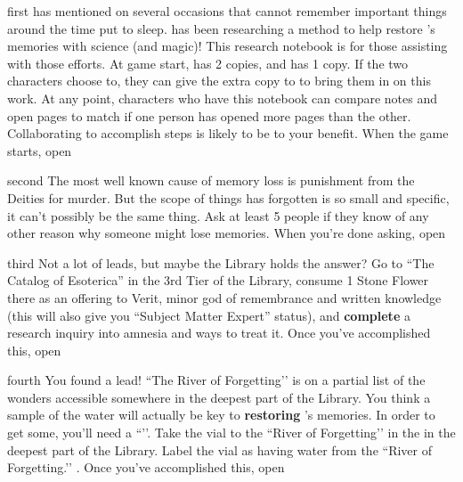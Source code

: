 \documentclass[notebook]{GL2020} %
\begin{document}
\startnotebook{\nRestoreMemories{}}

\begin{page}{first}
\cDisney{} has mentioned on several occasions that \cDisney{\they} cannot remember important things around the time \cDisney{\they} \cDisney{\were} put to sleep. \cTechStar{} has been researching a method to help restore \cDisney{}’s memories with science (and magic)! This research notebook is for those assisting with those efforts. At game start, \cDisney{} has 2 copies, and \cTechStar{} has 1 copy. If the two characters choose to, they can give the extra copy to \cWildCard{} to bring them in on this work. At any point, characters who have this notebook can compare notes and open pages to match if one person has opened more pages than the other. Collaborating to accomplish steps is likely to be to your benefit. When the game starts, open 
\end{page}

\begin{page}{second}
The most well known cause of memory loss is punishment from the Deities for murder. But the scope of things \cDisney{} has forgotten is so small and specific, it can’t possibly be the same thing. Ask at least 5 people if they know of any other reason why someone might lose memories. When you’re done asking, open 
\end{page}

\begin{page}{third}
Not a lot of leads, but maybe the Library holds the answer? Go to ``The Catalog of Esoterica'' in the 3rd Tier of the Library, consume 1 Stone Flower there as an offering to Verit, minor god of remembrance and written knowledge (this will also give you “Subject Matter Expert” status), and \textbf{complete} a research inquiry into amnesia and ways to treat it. Once you’ve accomplished this, open 
\end{page}

\begin{page}{fourth}
You found a lead! ``The River of Forgetting’’ is on a partial list of the wonders accessible somewhere in the deepest part of the Library. You think a sample of the water will actually be key to \textbf{restoring} \cDisney{}’s memories. In order to get some, you’ll need a ``\iGlassVial{}’’. Take the vial to the ``River of Forgetting’’ in the in the deepest part of the Library. Label the vial as having water from the ``River of Forgetting.’’ . Once you’ve accomplished this, open 
\end{page}
\end{document}
